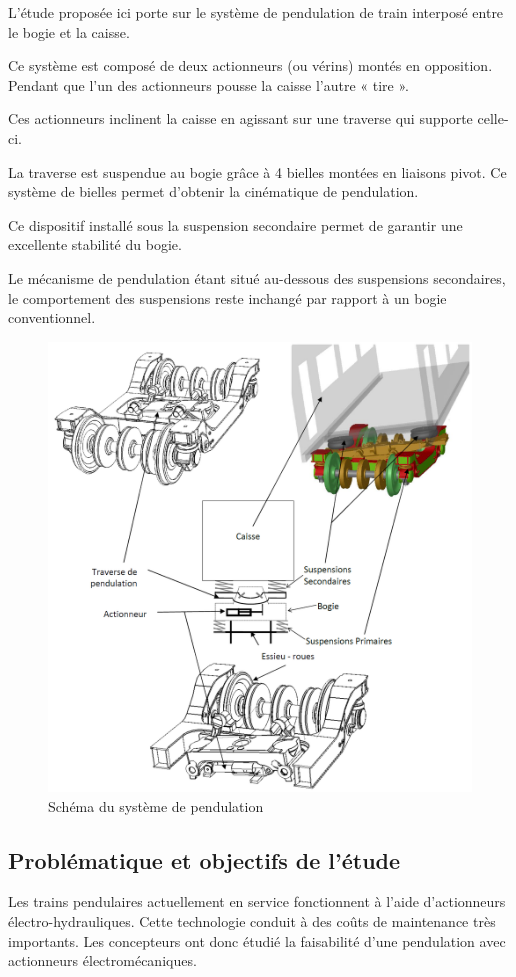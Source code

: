 L'étude proposée ici porte sur le système de pendulation de train interposé entre le bogie et la caisse.

Ce système est composé de deux actionneurs (ou vérins) montés en opposition. Pendant que l'un des actionneurs \og pousse \fg la caisse l'autre « tire ».

Ces actionneurs inclinent la caisse en agissant sur une traverse qui supporte celle-ci.

La traverse est \og suspendue \fg au bogie grâce à 4 bielles montées en liaisons pivot. Ce système de bielles permet d'obtenir la cinématique de pendulation.

Ce dispositif installé sous la suspension secondaire permet de garantir une excellente stabilité du bogie.

Le mécanisme de pendulation étant situé au-dessous des suspensions secondaires, le comportement des suspensions reste inchangé par rapport à un bogie conventionnel.

\begin{figure}[!h]
 \centering\includegraphics[width=0.65\linewidth]{img/fig2}
 \caption{Schéma du système de pendulation}
 \label{img02}
\end{figure}

\subsection{Problématique et objectifs de l'étude}

Les trains pendulaires actuellement en service fonctionnent à l'aide d'actionneurs électro-hydrauliques. Cette technologie conduit à des coûts de maintenance très importants. Les concepteurs ont donc étudié la faisabilité d'une pendulation avec actionneurs électromécaniques.

